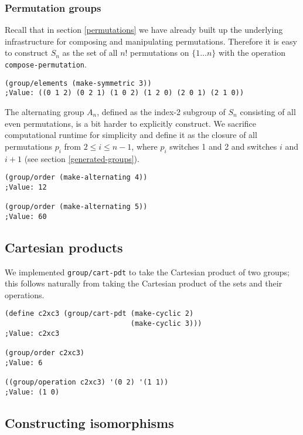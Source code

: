 \documentclass{article}
\begin{document}
            \subsubsection{Permutation groups}
                
                Recall that in section \ref{permutations} we have already built up the underlying infrastructure for composing and manipulating permutations. Therefore it is easy to construct $S_n$ as the set of all $n!$ permutations on $\{1\ldots n\}$ with the operation \texttt{compose-permutation}.

\begin{verbatim}
(group/elements (make-symmetric 3))
;Value: ((0 1 2) (0 2 1) (1 0 2) (1 2 0) (2 0 1) (2 1 0))
\end{verbatim}        

                The alternating group $A_n$, defined as the index-2 subgroup of $S_n$ consisting of all even permutations, is a bit harder to explicitly construct. We sacrifice computational runtime for simplicity and define it as the closure of all permutations $p_i$ from $2\leq i \leq n-1$, where $p_i$ switches 1 and 2 and switches $i$ and $i+1$ (see section \ref{generated-groups}).
		
\begin{verbatim}
(group/order (make-alternating 4))
;Value: 12

(group/order (make-alternating 5))
;Value: 60
\end{verbatim}
    
    	\subsection{Cartesian products}
            
            We implemented \texttt{group/cart-pdt} to take the Cartesian product of two groups; this follows naturally from taking the Cartesian product of the sets and their operations.
		
\begin{verbatim}
(define c2xc3 (group/cart-pdt (make-cyclic 2)
			                  (make-cyclic 3)))
;Value: c2xc3

(group/order c2xc3)
;Value: 6

((group/operation c2xc3) '(0 2) '(1 1))
;Value: (1 0)
\end{verbatim}
    
    	\subsection{Constructing isomorphisms}
            
\end{document}
